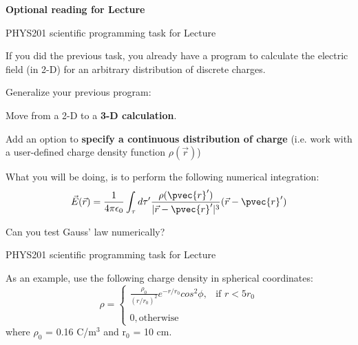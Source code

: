 %
%

\begin{frame}[plain,c]
\begin{center}
{\Huge \bf Optional reading for Lecture \thislecture}
\end{center}
\end{frame}

{
\programmingslide

%
%
%

\begin{frame}{PHYS201 scientific programming task for Lecture \thislecture}

{\small

If you did the previous task, you already have a program to calculate the
electric field (in 2-D) for an arbitrary distribution of discrete charges.\\
\vspace{0.2cm}

Generalize your previous program:
\begin{itemize}
{
  \item Move from a 2-D to a {\bf 3-D calculation}.
  \item Add an option to {\bf specify a continuous distribution of charge}
        (i.e. work with a user-defined charge density function $\rho(\vec{r})$)
}
\end{itemize}

\vspace{0.2cm}
What you will be doing, is to perform the following numerical integration:
\begin{equation*}
   \vec{E}(\vec{r}) = \frac{1}{4\pi\epsilon_0} \int_{\tau}
      d\tau^{\prime} \frac{\rho({\pvec{r}'})}{|\vec{r}-\pvec{r}'|^{3}} (\vec{r}-\pvec{r}')
\end{equation*}

\vspace{0.3cm}

Can you test Gauss' law numerically?

}
\end{frame}

%
%
%

\begin{frame}{PHYS201 scientific programming task for Lecture \thislecture}

{\small

As an example, use the following charge density in spherical coordinates:
\begin{equation*}
   \rho =
     \begin{cases}
       \frac{\rho_0}{(r/r_0)^2} e^{-r/r_0} cos^2\phi, & \text{if $r < 5 r_0$} \\
       & \\
       0, \text{otherwise}
     \end{cases}
\end{equation*}
where $\rho_0$ = 0.16 C/m$^{3}$ and r$_0$ = 10 cm.\\
%
%

}
\end{frame}}
